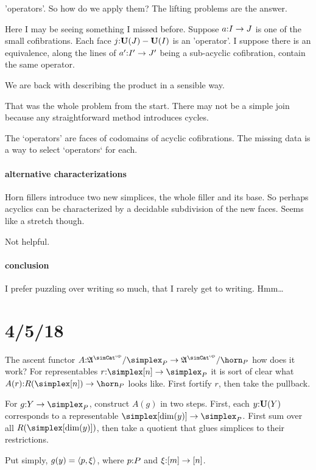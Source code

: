 \documentclass[csh.tex]{subfiles}
\begin{document}
'operators'. So how do we apply them? The lifting problems are the answer. 

Here I may be seeing something I missed before.
Suppose $a\mathord : I\to J$ is one of the small cofibrations. Each face $j\mathord :\mathbf{U}(J)-\mathbf{U}(I)$ is an 'operator'.
I suppose there is an equivalence, along the lines of $a'\mathord : I'\to J'$ being a sub-acyclic cofibration, contain the same operator.

We are back with describing the product in a sensible way. 

That was the whole problem from the start. There may not be a simple join because any straightforward method introduces cycles.

The `operators' are faces of codomains of acyclic cofibrations. The missing data is a way to select `operators` for each.


\paragraph{alternative characterizations}
Horn fillers introduce two new simplices, the whole filler and its base. So perhaps acyclics can be characterized by a decidable subdivision of the new faces. Seems like a stretch though.

Not helpful.

\paragraph{conclusion}
I prefer puzzling over writing so much, that I rarely get to writing. Hmm\dots


\section{4/5/18}

The ascent functor $A\of \ambient\s/\simplex_P \to \ambient\s/\horn_P$ how does it work? For representables $r\of \simplex[n]\to \simplex_P$ it is sort of clear what $A(r)\of R(\simplex[n])\to\horn_P$ looks like. First fortify $r$, then take the pullback.

For $g\of Y\to \simplex_P$, construct $A(g)$ in two steps. First, each $y\mathord :\mathbf{U}(Y)$ corresponds to a representable $\simplex[\dim(y)]\to \simplex_P$. First sum over all $R(\simplex[\dim(y)])$, then take a quotient that glues simplices to their restrictions.


Put simply, $g(y) = \left\langle p,\xi \right\rangle$, where $p\mathord : P$ and $\xi\mathord :[m]\to[n]$. 
\end{document}
